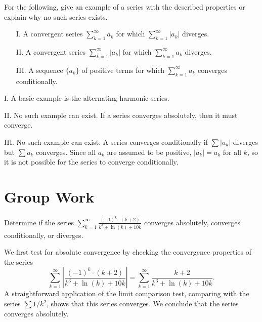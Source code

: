 \documentclass[]{ximera}
\begin{document}
\begin{problem}
For the following, give an example of a series with the described properties or explain why no such series exists.

\begin{itemize}
\item[I.] A convergent series $\sum_{k=1}^{\infty} a_k$ for which $\sum_{k=1}^{\infty} |a_k|$ diverges.

\item[II.] A convergent series $\sum_{k=1}^{\infty} |a_k|$ for which $\sum_{k=1}^{\infty} a_k$ diverges.

\item[III.] A sequence $\{a_k\}$ of positive terms for which $\sum_{k=1}^{\infty} a_k$ converges conditionally.

\end{itemize}


\begin{solution}
I. A basic example is the alternating harmonic series.

II. No such example can exist. If a series converges absolutely, then it must converge.

III. No such example can exist. A series converges conditionally if $\sum |a_k|$ diverges but $\sum a_k$ converges. Since all $a_k$ are assumed to be positive, $|a_k| = a_k$ for all $k$, so it is not possible for the series to converge conditionally.
\end{solution}
\end{problem}

\section{Group Work}

\begin{problem}
Determine if the series $\sum_{k=1}^\infty \frac{(-1)^k \cdot  (k+2)}{k^3+\ln(k) +10k}$ converges absolutely, converges conditionally, or diverges.

\begin{solution}
We first test for absolute convergence by checking the convergence properties of the series 
$$
\sum_{k=1}^\infty \left|\frac{(-1)^k \cdot  (k+2)}{k^3+\ln(k) +10k}\right| = \sum_{k=1}^\infty \frac{k+2}{k^3+\ln(k) +10k}.
$$
A straightforward application of the limit comparison test, comparing with the series $\sum 1/k^2$, shows that this series converges. We conclude that the series converges absolutely. 
\end{solution}
\end{problem}
\end{document}
